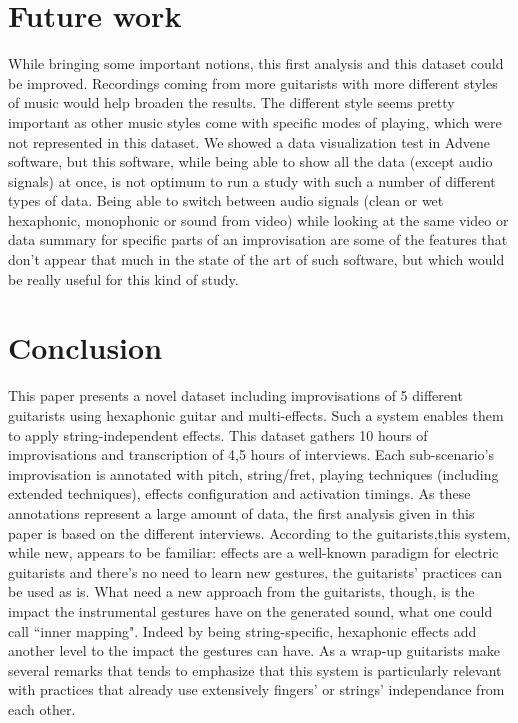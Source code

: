 \documentclass{article}
\begin{document}

\section{Future work}

While bringing some important notions, this first analysis and this dataset could be improved. Recordings coming from more guitarists with more different styles of music would help broaden the results.  The different style seems pretty important as other music styles come with specific modes of playing, which were not represented in this dataset.
We showed a data visualization test in Advene software, but this software, while being able to show all the data (except audio signals) at once, is not optimum to run a study with such a number of different types of data.  Being able to switch between audio signals (clean or wet hexaphonic, monophonic or sound from video) while looking at the same video or data summary for specific parts of an improvisation are some of the features that don't appear that much in the state of the art of such software, but which would be really useful for this kind of study.

\section{Conclusion}\label{sec:conclusion}
This paper presents a novel dataset including improvisations of 5 different guitarists using hexaphonic guitar and multi-effects. Such a system enables them to apply string-independent effects. This dataset gathers 10 hours of improvisations and transcription of 4,5 hours of interviews. 
Each sub-scenario's improvisation is annotated with pitch, string/fret, playing techniques (including extended techniques), effects configuration and activation timings. As these annotations represent a large amount of data, the first analysis given in this paper is based on the different interviews. According to the guitarists,this system, while new, appears to be familiar: effects are a well-known paradigm for electric guitarists and there's no need to learn new gestures, the guitarists' practices can be used as is. What need a new approach from the guitarists, though, is the impact the instrumental gestures have on the generated sound, what one could call ``inner mapping".  Indeed by being string-specific, hexaphonic effects add another level to the impact the gestures can have.
As a wrap-up guitarists make several remarks that tends to emphasize that this system is particularly relevant with practices that already use extensively fingers' or strings' independance from each other.
\end{document}
